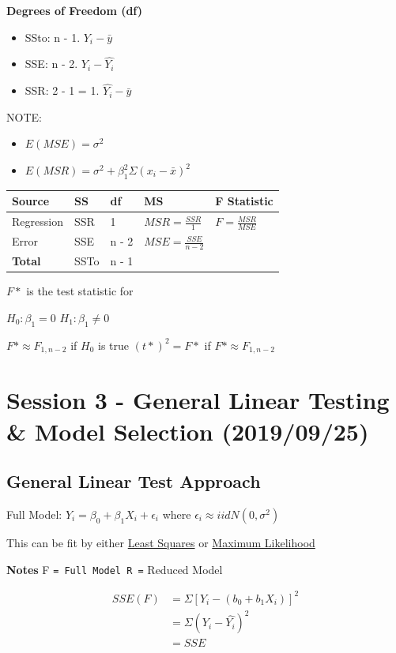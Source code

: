 \documentclass[11pt]{article}
\begin{document}
\textbf{Degrees of Freedom (df)}
\begin{itemize}
\item SSto: n - 1. \(Y_i - \bar{y}\)
\item SSE: n - 2. \(Y_i - \hat{Y_i}\)
\item SSR: 2 - 1 = 1. \(\hat{Y_i} - \bar{y}\)
\end{itemize}


NOTE:
\begin{itemize}
\item \(E(MSE) = \sigma^2\)
\item \(E(MSR) = \sigma^2 + \beta_1^2 \Sigma (x_i - \bar{x})^2\)
\end{itemize}

\begin{center}
\begin{tabular}{lllll}
Source & SS & df & MS & F Statistic\\
\hline
Regression & SSR & 1 & \(MSR = \frac{SSR}{1}\) & \(F = \frac{MSR}{MSE}\)\\
Error & SSE & n - 2 & \(MSE = \frac{SSE}{n - 2}\) & \\
\textbf{Total} & SSTo & n - 1 &  & \\
\end{tabular}
\end{center}

\(F*\) is the test statistic for

\(H_0: \beta_1 = 0\)
\(H_1: \beta_1 \neq 0\)

\(F* \approx F_{1, n-2}\) if \(H_0\) is true
\((t*)^2 = F*\) if \(F* \approx F_{1, n - 2}\)
\section{Session 3 - General Linear Testing \& Model Selection (2019/09/25)}
\label{sec:org3eaf822}
\subsection{General Linear Test Approach}
\label{sec:orgaaf1348}

Full Model: \(Y_i = \beta_0 + \beta_1 X_i + \epsilon_i\) where \(\epsilon_i \approx
iid N(0, \sigma^2)\)

This can be fit by either \uline{Least Squares} or \uline{Maximum Likelihood}

\textbf{Notes}
F \texttt{= Full Model
R =} Reduced Model

\begin{equation}
\begin{split}
SSE(F) & = \Sigma [ Y_i - (b_0 + b_1 X_i) ]^2 \\
& = \Sigma{ (Y_i - \hat{Y_i})^2} \\
& = SSE
\end{split}
\end{equation}
\end{document}
